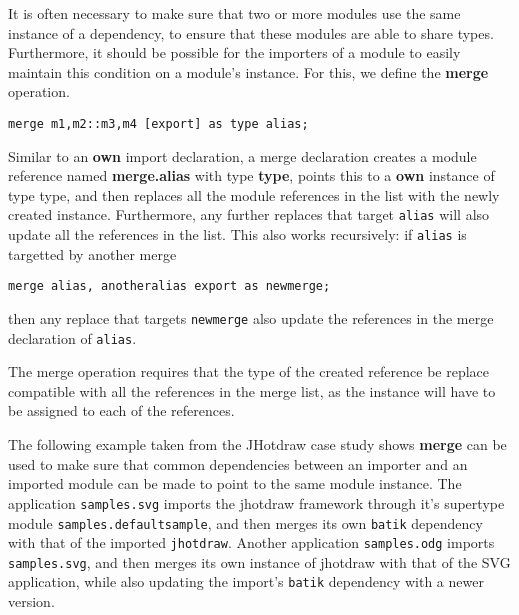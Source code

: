 


It is often necessary to make sure that two or more modules use the same
instance of a dependency, to ensure that these
modules are able to share types. Furthermore, it should be possible for
the importers of a module to easily maintain this condition on a module's
instance. For this, we define the \textbf{merge} operation.

\begin{lstlisting}
merge m1,m2::m3,m4 [export] as type alias;
\end{lstlisting}

Similar to an \textbf{own} import declaration, a merge declaration creates
a module reference named \textbf{merge.alias} with type \textbf{type},
points this to a \textbf{own} instance of type type, and then replaces all
the module references in the list with the newly created instance. Furthermore,
any further replaces that target \texttt{alias} will also update all
the references in the list. This also works recursively: if \texttt{alias}
is targetted by another merge 
\begin{lstlisting}
merge alias, anotheralias export as newmerge;
\end{lstlisting}
then any replace that targets \texttt{newmerge} also update the references
in the merge declaration of \texttt{alias}.

The merge operation requires that the type of the created reference be replace
compatible with all the references in the merge list, as the instance will
have to be assigned to each of the references.

The following example taken from the JHotdraw case study shows \textbf{merge}
can be used to make sure that common dependencies between an importer and
an imported module can be made to point to the same module instance. The
application \texttt{samples.svg} imports the jhotdraw framework through
it's supertype module \texttt{samples.defaultsample}, and then merges
its own \texttt{batik} dependency with that of the imported \texttt{jhotdraw}.
Another application \texttt{samples.odg} imports \texttt{samples.svg}, 
and then merges its own instance of jhotdraw with that of the SVG application, 
while also updating the import's \texttt{batik} dependency with a newer version.


